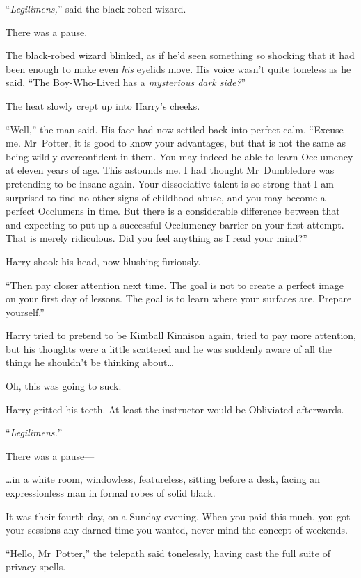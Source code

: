 “\emph{Legilimens,}” said the black-robed wizard.

There was a pause.

The black-robed wizard blinked, as if he’d seen something so shocking that it had been enough to make even \emph{his} eyelids move. His voice wasn’t quite toneless as he said, “The Boy-Who-Lived has a \emph{mysterious dark side?}”

The heat slowly crept up into Harry’s cheeks.

“Well,” the man said. His face had now settled back into perfect calm. “Excuse me. Mr~Potter, it is good to know your advantages, but that is not the same as being wildly overconfident in them. You may indeed be able to learn Occlumency at eleven years of age. This astounds me. I had thought Mr~Dumbledore was pretending to be insane again. Your dissociative talent is so strong that I am surprised to find no other signs of childhood abuse, and you may become a perfect Occlumens in time. But there is a considerable difference between that and expecting to put up a successful Occlumency barrier on your first attempt. That is merely ridiculous. Did you feel anything as I read your mind?”

Harry shook his head, now blushing furiously.

“Then pay closer attention next time. The goal is not to create a perfect image on your first day of lessons. The goal is to learn where your surfaces are. Prepare yourself.”

Harry tried to pretend to be Kimball Kinnison again, tried to pay more attention, but his thoughts were a little scattered and he was suddenly aware of all the things he shouldn’t be thinking about…

Oh, this was going to suck.

Harry gritted his teeth. At least the instructor would be Obliviated afterwards.

“\emph{Legilimens.}”

There was a pause—

\later

…in a white room, windowless, featureless, sitting before a desk, facing an expressionless man in formal robes of solid black.

It was their fourth day, on a Sunday evening. When you paid this much, you got your sessions any darned time you wanted, never mind the concept of weekends.

“Hello, Mr~Potter,” the telepath said tonelessly, having cast the full suite of privacy spells.

